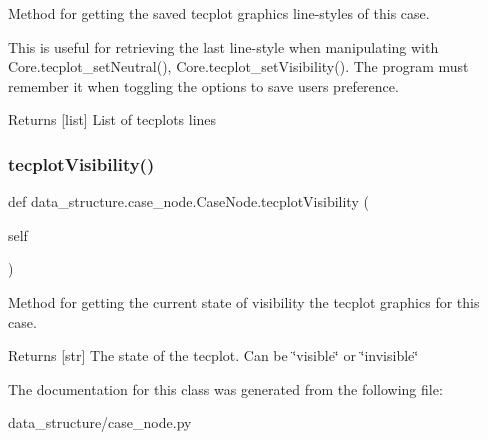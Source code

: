 Method for getting the saved tecplot graphics line-\/styles of this case. 

This is useful for retrieving the last line-\/style when manipulating with Core.\+tecplot\+\_\+set\+Neutral(), Core.\+tecplot\+\_\+set\+Visibility(). The program must remember it when toggling the options to save user\textquotesingle{}s preference.

\begin{DoxyReturn}{Returns}
\mbox{[}list\mbox{]} List of tecplots lines 
\end{DoxyReturn}
\hypertarget{a00087_aeb90281663e7094357befb23383a0d12}{}\label{a00087_aeb90281663e7094357befb23383a0d12} 
\subsubsection{\texorpdfstring{tecplot\+Visibility()}{tecplotVisibility()}}
{\footnotesize\ttfamily def data\+\_\+structure.\+case\+\_\+node.\+Case\+Node.\+tecplot\+Visibility (\begin{DoxyParamCaption}\item[{}]{self }\end{DoxyParamCaption})}



Method for getting the current state of visibility the tecplot graphics for this case. 

\begin{DoxyReturn}{Returns}
\mbox{[}str\mbox{]} The state of the tecplot. Can be \char`\"{}visible\char`\"{} or \char`\"{}invisible\char`\"{} 
\end{DoxyReturn}


The documentation for this class was generated from the following file\+:\begin{DoxyCompactItemize}
\item 
data\+\_\+structure/case\+\_\+node.\+py\end{DoxyCompactItemize}
